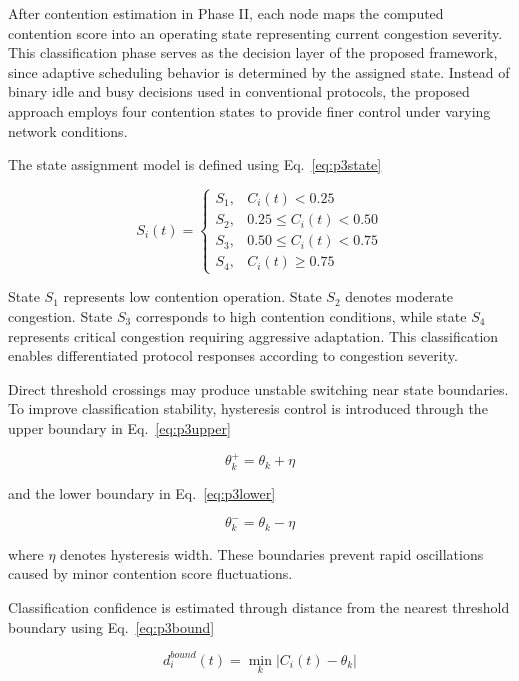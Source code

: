 \documentclass[a4paper,fleqn,final,1p]{cas-dc}
\numberwithin{equation}{section}
\begin{document}
After contention estimation in Phase II, each node maps the computed contention score into an operating state representing current congestion severity. This classification phase serves as the decision layer of the proposed framework, since adaptive scheduling behavior is determined by the assigned state. Instead of binary idle and busy decisions used in conventional protocols, the proposed approach employs four contention states to provide finer control under varying network conditions.

The state assignment model is defined using Eq.~\ref{eq:p3state}

\begin{equation}
S_i(t)=
\begin{cases}
S_1, & C_i(t)<0.25 \\
S_2, & 0.25\le C_i(t)<0.50 \\
S_3, & 0.50\le C_i(t)<0.75 \\
S_4, & C_i(t)\ge0.75
\end{cases}
\label{eq:p3state}
\end{equation}

State $S_1$ represents low contention operation. State $S_2$ denotes moderate congestion. State $S_3$ corresponds to high contention conditions, while state $S_4$ represents critical congestion requiring aggressive adaptation. This classification enables differentiated protocol responses according to congestion severity.

Direct threshold crossings may produce unstable switching near state boundaries. To improve classification stability, hysteresis control is introduced through the upper boundary in Eq.~\ref{eq:p3upper}

\begin{equation}
\theta_k^{+}
=
\theta_k+\eta
\label{eq:p3upper}
\end{equation}

and the lower boundary in Eq.~\ref{eq:p3lower}

\begin{equation}
\theta_k^{-}
=
\theta_k-\eta
\label{eq:p3lower}
\end{equation}

where $\eta$ denotes hysteresis width. These boundaries prevent rapid oscillations caused by minor contention score fluctuations.

Classification confidence is estimated through distance from the nearest threshold boundary using Eq.~\ref{eq:p3bound}

\begin{equation}
d_i^{bound}(t)=
\min_k
\left|
C_i(t)-\theta_k
\right|
\label{eq:p3bound}
\end{equation}
\end{document}
